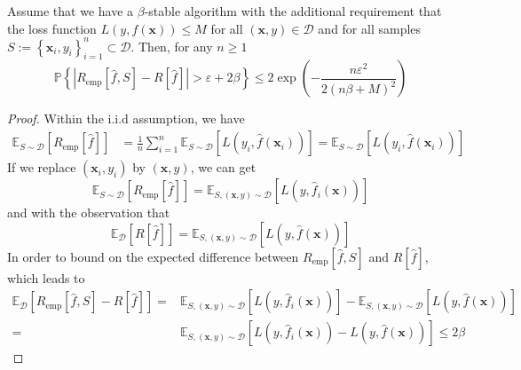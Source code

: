 \documentclass[a4paper, 12pt, mtpro2, authoryear]{elegantpaper}
\begin{document}
\begin{theorem}
    \label{thm:bousquet-and-elisseeff}
    Assume that we have a $\beta$-stable algorithm with the additional requirement that the loss function $L\left(y,f(\mathbf{x})\right)\leq M$ for all $(\mathbf{x},y)\in\mathcal{D}$ and for all samples $S:=\left\{\mathbf{x}_{i},y_{i}\right\}_{i=1}^{n}\subset\mathcal{D}$. Then, for any $n\geq 1$
    \begin{equation}
        \mathbb{P}\left\{\left|R_{\text{emp}}[\hat{f},S]-R[\hat{f}]\right|>\varepsilon+2\beta\right\}\leq 2\exp\left(-\frac{n\varepsilon^{2}}{2(n\beta+M)^{2}}\right)
    \end{equation}
\end{theorem}

\begin{proof}
    Within the i.i.d assumption, we have
    \begin{equation}
        \begin{aligned}
            \mathbb{E}_{S\sim\mathcal{D}}\left[R_{\text{emp}}[\hat{f}]\right] & =\frac{1}{n}\sum_{i=1}^{n}\mathbb{E}_{S\sim\mathcal{D}}\left[L\left(y_{i},\hat{f}(\mathbf{x}_{i})\right)\right]=\mathbb{E}_{S\sim\mathcal{D}}\left[L\left(y_{i},\hat{f}(\mathbf{x}_{i})\right)\right]
        \end{aligned}
    \end{equation}
    If we replace $(\mathbf{x}_{i},y_{i})$ by $(\mathbf{x},y)$, we can get
    \begin{equation}
        \mathbb{E}_{S\sim\mathcal{D}}\left[R_{\text{emp}}[\hat{f}]\right]=\mathbb{E}_{S,\left(\mathbf{x},y\right)\sim\mathcal{D}}\left[L\left(y,\hat{f}_{i}(\mathbf{x})\right)\right]
    \end{equation}
    and with the observation that
    \begin{equation}
        \mathbb{E}_{\mathcal{D}}\left[R[\hat{f}]\right]=\mathbb{E}_{S,\left(\mathbf{x},y\right)\sim\mathcal{D}}\left[L\left(y,\hat{f}(\mathbf{x})\right)\right]
    \end{equation}
    In order to bound on the expected difference between $R_{\text{emp}}[\hat{f},S]$ and $R[\hat{f}]$, which leads to
    \begin{equation}
        \begin{aligned}
            \mathbb{E}_{\mathcal{D}}\left[R_{\text{emp}}[\hat{f},S]-R[\hat{f}]\right]= & \mathbb{E}_{S,\left(\mathbf{x},y\right)\sim\mathcal{D}}\left[L\left(y,\hat{f}_{i}(\mathbf{x})\right)\right]-\mathbb{E}_{S,\left(\mathbf{x},y\right)\sim\mathcal{D}}\left[L\left(y,\hat{f}(\mathbf{x})\right)\right] \\
            =                                                                          & \mathbb{E}_{S,\left(\mathbf{x},y\right)\sim\mathcal{D}}\left[L\left(y,\hat{f}_{i}(\mathbf{x})\right)-L\left(y,\hat{f}(\mathbf{x})\right)\right]\leq 2\beta
        \end{aligned}
    \end{equation}


\end{proof}
\end{document}
